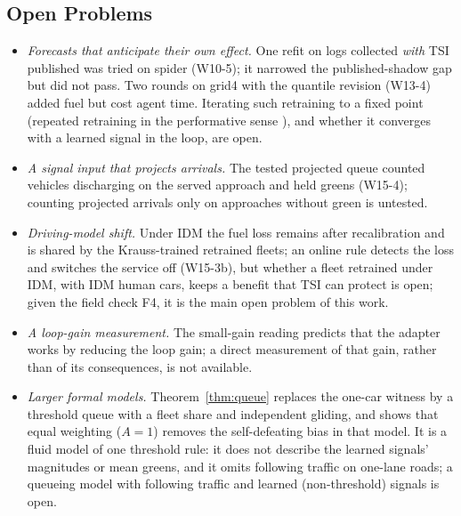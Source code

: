 \subsection{Open Problems}
\begin{itemize}\setlength\itemsep{1pt}
\item \emph{Forecasts that anticipate their own effect.} One refit on logs collected \emph{with} TSI published was tried on spider (W10-5); it
narrowed the published-shadow gap but did not pass. Two rounds on grid4 with the quantile revision (W13-4) added fuel but cost agent time. Iterating such retraining to a fixed point (repeated retraining in the performative
sense \cite{perdomo2020}), and whether it converges with a learned signal in the loop, are open.
\item \emph{A signal input that projects arrivals.} The tested projected queue counted vehicles discharging on the served approach and
held greens (W15-4); counting projected arrivals only on approaches without green is untested.
\item \emph{Driving-model shift.} Under IDM the fuel loss remains after recalibration and is shared by the Krauss-trained retrained fleets;
an online rule detects the loss and switches the service off (W15-3b), but whether a fleet retrained under IDM, with IDM human cars, keeps
a benefit that TSI can protect is open; given the field check F4, it is the main open problem of this work.
\item \emph{A loop-gain measurement.} The small-gain reading predicts that the adapter works by reducing the loop gain; a direct
measurement of that gain, rather than of its consequences, is not available.
\item \emph{Larger formal models.} Theorem~\ref{thm:queue} replaces the one-car witness by a threshold queue with a fleet share and
independent gliding, and shows that equal weighting ($A=1$) removes the self-defeating bias in that model. It is a fluid model of one threshold rule:
it does not describe the learned signals' magnitudes or mean greens, and it omits following traffic on one-lane roads; a queueing model
with following traffic and learned (non-threshold) signals is open.
\end{itemize}

